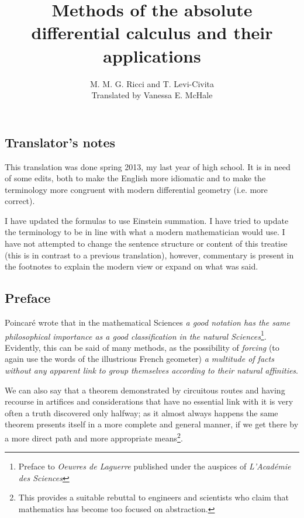 \documentclass{book}
\begin{document}
\title{Methods of the absolute differential calculus and their applications}
\author{M. M. G. Ricci and T. Levi-Civita\\
Translated by Vanessa E. McHale}
\date{}
\maketitle
\tableofcontents

\subsection*{Translator's notes}
This translation was done spring 2013, my last year of high school. It is in need of some edits, both to make the English more idiomatic and to make the terminology more congruent with modern differential geometry (i.e. more correct). 

I have updated the formulas to use Einstein summation. I have tried to update the terminology to be in line with what a modern mathematician would use. I have not attempted to change the sentence structure or content of this treatise (this is in contrast to a previous translation), however, commentary is present in the footnotes to explain the modern view or expand on what was said.
\subsection*{Preface}
Poincar\'{e} wrote that in the mathematical Sciences \emph{a good notation has the same philosophical importance as a good classification in the natural Sciences}\footnote{Preface to \emph{Oeuvres de Laguerre} published under the auspices of \emph{L'Acad\'{e}mie des Sciences}}. Evidently, this can be said of many methods, as the possibility of \emph{forcing} (to again use the words of the illustrious French geometer) \emph{a multitude of facts without any apparent link to group themselves according to their natural affinities}.

We can also say that a theorem demonstrated by circuitous routes and having recourse in artifices and considerations that have no essential link with it is very often a truth discovered only halfway; as it almost always happens the same theorem presents itself in a more complete and general manner, if we get there by a more direct path and more appropriate means\footnote{This provides a suitable rebuttal to engineers and scientists who claim that mathematics has become too focused on abstraction.}.
\end{document}
